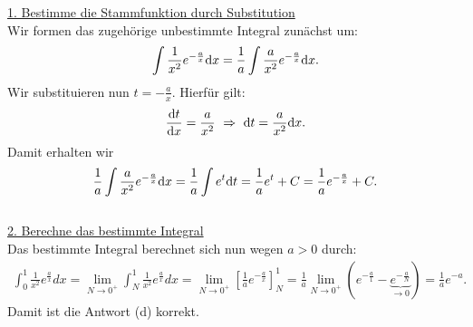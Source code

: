 \underline{1. Bestimme die Stammfunktion durch Substitution}\\
Wir formen das zugehörige unbestimmte Integral zunächst um:
\begin{align*}
	\int \frac{1}{x^2} e^{-\frac{a}{x}} \text{\rmfamily d} x
	=
	\frac{1}{a} \int \frac{a}{x^2} e^{-\frac{a}{x}} \text{\rmfamily d} x.
\end{align*}
Wir substituieren nun $ t = -\frac{a}{x} $. Hierfür gilt:
\begin{align*}
	\frac{\td{t}}{\td{x}} = \frac{a}{x^2} \ \Rightarrow
	\ 
	\td{t} =\frac{a}{x^2} \td{x} .
\end{align*}
Damit erhalten wir
\begin{align*}
	\frac{1}{a} \int \frac{a}{x^2} e^{-\frac{a}{x}} \text{\rmfamily d} x
	=
	\frac{1}{a} \int e^{t} \text{\rmfamily d} t
	=
	\frac{1}{a} e^t + C
	=
	\frac{1}{a} e^{- \frac{a}{x}} +C.
\end{align*}
\ \\
\underline{2. Berechne das bestimmte Integral}\\
Das bestimmte Integral berechnet sich nun wegen $ a > 0  $ durch:
\begin{align*}
	\int_0^1
	\frac{1}{x^2} e^{\frac{a}{x}} dx
	=
	\lim
	\limits_{N\to 0^+}
	\int_N^1
	\frac{1}{x^2} e^{\frac{a}{x}} dx
	=
	\lim 
	\limits_{N\to 0^+}
	\left[\frac{1}{a} e^{- \frac{a}{x}}\right]_N^1
	=
	\frac{1}{a}
	\lim
	\limits_{N\to 0^+} \left(e^{- \frac{a}{1}}  - \underbrace{e^{- \frac{a}{N}}}_{\to 0}\right)
	=
	\frac{1}{a}  e^{-a}.
\end{align*}
Damit ist die Antwort (d) korrekt.

\newpage
